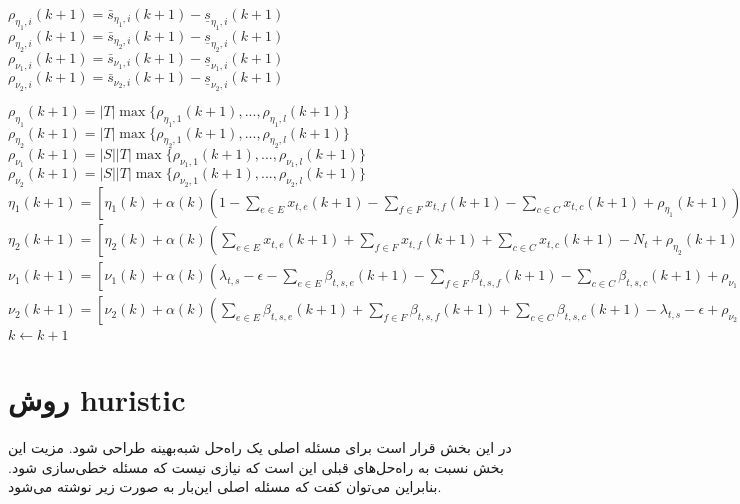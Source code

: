 \begin{latin}
\begin{algorithm}
\begin{algorithmic}[1]
					\State $\rho_{\eta_1,i}(k+1) = \bar{s}_{\eta_1,i}(k+1) - \underline{s}_{\eta_1,i}(k+1)$
					\State $\rho_{\eta_2,i}(k+1) = \bar{s}_{\eta_2,i}(k+1) - \underline{s}_{\eta_2,i}(k+1)$
					\State $\rho_{\nu_1,i}(k+1) = \bar{s}_{\nu_1,i}(k+1) - \underline{s}_{\nu_1,i}(k+1)$
					\State $\rho_{\nu_2,i}(k+1) = \bar{s}_{\nu_2,i}(k+1) - \underline{s}_{\nu_2,i}(k+1)$
				\EndFor
				
				\State $\rho_{\eta_1}(k+1) = |T| \max \{ \rho_{\eta_1,1}(k+1), ..., \rho_{\eta_1,l}(k+1)\}$
				\State $\rho_{\eta_2}(k+1) = |T| \max \{ \rho_{\eta_2,1}(k+1), ..., \rho_{\eta_2,l}(k+1)\}$
				\State $\rho_{\nu_1}(k+1) = |S||T| \max \{ \rho_{\nu_1,1}(k+1), ..., \rho_{\nu_1,l}(k+1)\}$
				\State $\rho_{\nu_2}(k+1) = |S||T| \max \{ \rho_{\nu_2,1}(k+1), ..., \rho_{\nu_2,l}(k+1)\}$
				\State $\eta_1(k+1) = [\eta_1(k) + \alpha(k)(1-\sum_{e \in E}x_{t,e}(k+1) - \sum_{f \in F}x_{t,f}(k+1) - \sum_{c \in C}x_{t,c}(k+1)+\rho_{\eta_1}(k+1))]_+$
				\State $\eta_2(k+1) = [\eta_2(k) + \alpha(k)(\sum_{e \in E}x_{t,e}(k+1) + \sum_{f \in F}x_{t,f}(k+1) + \sum_{c \in C}x_{t,c}(k+1) - N_t +\rho_{\eta_2}(k+1))]_+$
				\State $\nu_1(k+1) = [\nu_1(k) + \alpha(k)( \lambda_{t,s} - \epsilon - \sum_{e \in E}\beta_{t,s,e}(k+1) - \sum_{f \in F}\beta_{t,s,f}(k+1) - \sum_{c \in C}\beta_{t,s,c}(k+1) +\rho_{\nu_1}(k+1))]_+$
				\State $\nu_2(k+1) = [\nu_2(k) + \alpha(k)( \sum_{e \in E}\beta_{t,s,e}(k+1) + \sum_{f \in F}\beta_{t,s,f}(k+1) + \sum_{c \in C}\beta_{t,s,c}(k+1) -\lambda_{t,s} - \epsilon + \rho_{\nu_2}(k+1))]_+$
				\State $k \gets k+1$ 
			\EndProcedure
		\end{algorithmic}
	\end{algorithm}
\end{latin}


\section{روش huristic}

	در این بخش قرار است برای مسئله اصلی یک راه‌حل شبه‌بهینه طراحی شود. مزیت این بخش نسبت به راه‌حل‌های قبلی این است که نیازی نیست که مسئله خطی‌سازی شود. بنابراین می‌توان کفت که مسئله اصلی این‌بار به صورت زیر نوشته می‌شود. 
	
	
